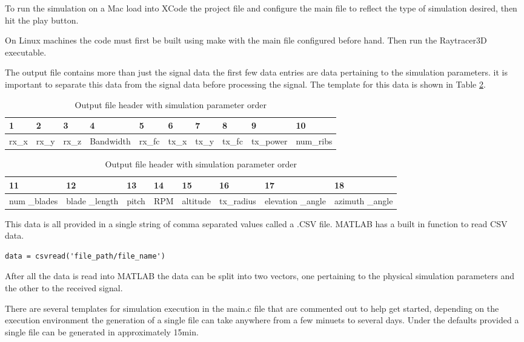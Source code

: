 To run the simulation on a Mac load into XCode the project file and configure the main file to reflect the type of simulation desired, then hit the play button.

On Linux machines the code must first be built using make with the main file configured before hand. Then run the Raytracer3D executable.

The output file contains more than just the signal data the first few data entries are data pertaining to the simulation parameters. it is important to separate this data from the signal data before processing the signal. The template for this data is shown in Table 
\ref{tab:file_values}.

\begin{table}
\begin{center}
    \begin{tabular}{| l | l | l | l | l | l | l | l | l | l |}
    \hline
    1 & 2 & 3 & 4 & 5 & 6 & 7 & 8 & 9 & 10 \\ \hline
      rx\_x & rx\_y & rx\_z & Bandwidth & rx\_fc & tx\_x & tx\_y & tx\_fc & tx\_power & num\_ribs \\ \hline
    \end{tabular}
    \begin{tabular}{| p{1cm} | p{1cm} | l | l | l | l | p{1.5cm} | p{1.5cm} |}
    \hline
    11 & 12 & 13 & 14 & 15 & 16 & 17 & 18\\ \hline
     num \_blades & blade \_length & pitch & RPM & altitude & tx\_radius & elevation \_angle & azimuth \_angle \\ \hline
    \end{tabular}
     \caption{Output file header with simulation parameter order}
    \label{tab:file_values}
\end{center}
\end{table}

This data is all provided in a single string of comma separated values called a .CSV file. MATLAB has a built in function to read CSV data.

\begin{lstlisting}
data = csvread('file_path/file_name')
\end{lstlisting}

After all the data is read into MATLAB the data can be split into two vectors, one pertaining to the physical simulation parameters and the other to the received signal.

There are several templates for simulation execution in the main.c file that are commented out to help get started, depending on the execution environment the generation of a single file can take anywhere from a few minuets to several days. Under the defaults provided a single file can be generated in approximately 15min.
 